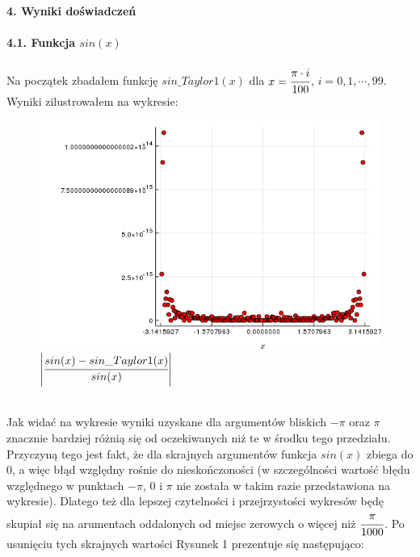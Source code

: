 \documentclass[a4paper]{article}
\begin{document}
\Large
\textbf{4. Wyniki doświadczeń}\\\\
\large
\textbf{4.1. Funkcja $sin(x)$}\\\\
\normalsize
Na początek zbadałem funkcję $sin\_Taylor1(x)$ dla $ x = \cfrac{\pi \cdot i}{100}$, $i=0,1,\cdots,99$. Wyniki zilustrowałem na wykresie:
\begin{figure}[h]
  \includegraphics[width=14cm]{sin_Taylor1.png}
  \caption{$\left| \cfrac{sin(x) - sin\_Taylor1(x)}{sin(x)} \right| $}
\end{figure}\\

Jak widać na wykresie wyniki uzyskane dla argumentów bliskich $-\pi$ oraz $\pi$ znacznie bardziej różnią się od oczekiwanych niż te w środku tego przedziału. Przyczyną tego jest fakt, że dla skrajnych argumentów funkcja $sin(x)$ zbiega do $0$, a więc błąd względny rośnie do nieskończoności (w szczególności wartość błędu względnego w punktach $-\pi$, $0$ i $\pi$ nie została w takim razie przedstawiona na wykresie). Dlatego też dla lepszej czytelności i przejrzystości wykresów będę skupiał się na arumentach oddalonych od miejsc zerowych o więcej niż $\cfrac{\pi}{1000}$. Po usunięciu tych skrajnych wartości Rysunek 1 prezentuje się następująco:\\
\\
\end{document}
